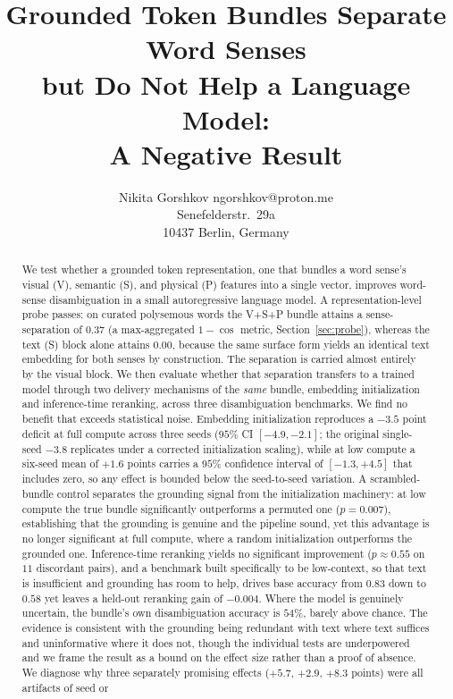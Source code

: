 \documentclass[twoside,11pt]{article}
\begin{document}
\title{Grounded Token Bundles Separate Word Senses\\
but Do Not Help a Language Model:\\
A Negative Result}

\author{\name Nikita Gorshkov \email ngorshkov@proton.me \\
       \addr Senefelderstr.\ 29a\\
       10437 Berlin, Germany}

\editor{}

\maketitle

\begin{abstract}%
We test whether a grounded token representation, one that bundles a word sense's visual (V), semantic (S), and physical (P) features into a single vector, improves word-sense disambiguation in a small autoregressive language model. A representation-level probe passes: on curated polysemous words the V+S+P bundle attains a sense-separation of $0.37$ (a max-aggregated $1-\cos$ metric, Section~\ref{sec:probe}), whereas the text (S) block alone attains $0.00$, because the same surface form yields an identical text embedding for both senses by construction. The separation is carried almost entirely by the visual block. We then evaluate whether that separation transfers to a trained model through two delivery mechanisms of the \emph{same} bundle, embedding initialization and inference-time reranking, across three disambiguation benchmarks. We find no benefit that exceeds statistical noise. Embedding initialization reproduces a $-3.5$ point deficit at full compute across three seeds ($95\%$ CI $[-4.9, -2.1]$; the original single-seed $-3.8$ replicates under a corrected initialization scaling), while at low compute a six-seed mean of $+1.6$ points carries a $95\%$ confidence interval of $[-1.3, +4.5]$ that includes zero, so any effect is bounded below the seed-to-seed variation. A scrambled-bundle control separates the grounding signal from the initialization machinery: at low compute the true bundle significantly outperforms a permuted one ($p = 0.007$), establishing that the grounding is genuine and the pipeline sound, yet this advantage is no longer significant at full compute, where a random initialization outperforms the grounded one. Inference-time reranking yields no significant improvement ($p \approx 0.55$ on $11$ discordant pairs), and a benchmark built specifically to be low-context, so that text is insufficient and grounding has room to help, drives base accuracy from $0.83$ down to $0.58$ yet leaves a held-out reranking gain of $-0.004$. Where the model is genuinely uncertain, the bundle's own disambiguation accuracy is $54\%$, barely above chance. The evidence is consistent with the grounding being redundant with text where text suffices and uninformative where it does not, though the individual tests are underpowered and we frame the result as a bound on the effect size rather than a proof of absence. We diagnose why three separately promising effects ($+5.7$, $+2.9$, $+8.3$ points) were all artifacts of seed or 
\end{abstract}
\end{document}
